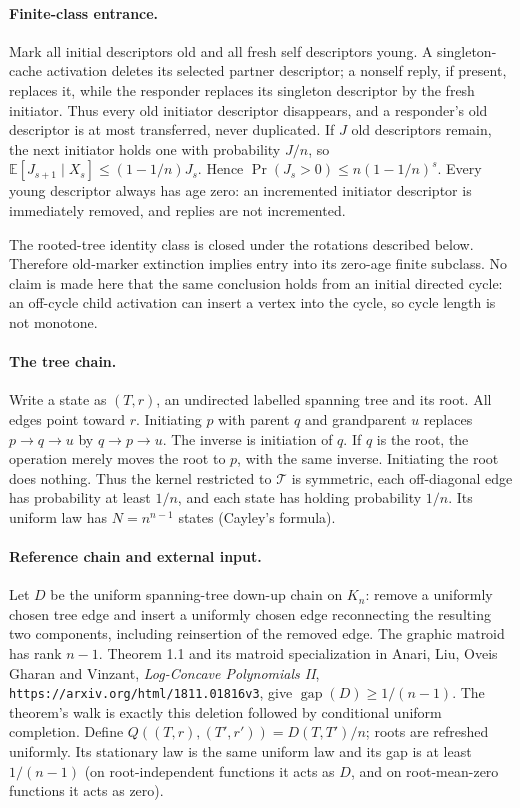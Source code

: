 \documentclass[11pt]{article}
\begin{document}
\paragraph{Finite-class entrance.}
Mark all initial descriptors old and all fresh self descriptors young.
A singleton-cache activation deletes its selected partner descriptor;
a nonself reply, if present, replaces it, while the responder replaces
its singleton descriptor by the fresh initiator. Thus every old
initiator descriptor disappears, and a responder's old descriptor is
at most transferred, never duplicated. If $J$ old descriptors remain,
the next initiator holds one with probability $J/n$, so
$\mathbb E[J_{s+1}\mid X_s]\le(1-1/n)J_s$. Hence
$\Pr(J_s>0)\le n(1-1/n)^s$. Every young descriptor always has age
zero: an incremented initiator descriptor is immediately removed,
and replies are not incremented.

The rooted-tree identity class is closed under the rotations described
below. Therefore old-marker extinction implies entry into its zero-age
finite subclass. No claim is made here that the same conclusion holds
from an initial directed cycle: an off-cycle child activation can
insert a vertex into the cycle, so cycle length is not monotone.

\paragraph{The tree chain.}
Write a state as $(T,r)$, an undirected labelled spanning tree and its
root. All edges point toward $r$. Initiating $p$ with parent $q$ and
grandparent $u$ replaces $p\to q\to u$ by $q\to p\to u$.
The inverse is initiation of $q$. If $q$ is the root, the operation
merely moves the root to $p$, with the same inverse. Initiating the
root does nothing. Thus the kernel restricted to $\mathcal T$ is
symmetric, each off-diagonal edge has probability at least $1/n$,
and each state has holding probability $1/n$. Its uniform law has
$N=n^{n-1}$ states (Cayley's formula).

\paragraph{Reference chain and external input.}
Let $D$ be the uniform spanning-tree down-up chain on $K_n$: remove
a uniformly chosen tree edge and insert a uniformly chosen edge
reconnecting the resulting two components, including reinsertion
of the removed edge. The graphic matroid has rank $n-1$.
Theorem 1.1 and its matroid specialization in Anari, Liu, Oveis Gharan
and Vinzant, \emph{Log-Concave Polynomials II},
\texttt{https://arxiv.org/html/1811.01816v3}, give
$\operatorname{gap}(D)\ge1/(n-1)$. The theorem's walk is exactly
this deletion followed by conditional uniform completion.
Define $Q((T,r),(T',r'))=D(T,T')/n$; roots are refreshed uniformly.
Its stationary law is the same uniform law and its gap is at least
$1/(n-1)$ (on root-independent functions it acts as $D$, and on
root-mean-zero functions it acts as zero).
\end{document}
